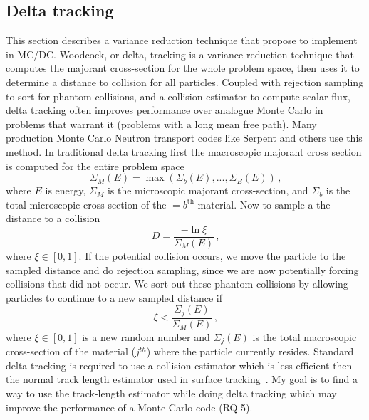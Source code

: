 %

\subsection{Delta tracking}

This section describes a variance reduction technique that propose to implement in MC/DC.
Woodcock, or delta, tracking \cite{woodcock_techniques_1965} is a variance-reduction technique that computes the majorant cross-section for the whole problem space, then uses it to determine a distance to collision for all particles.
Coupled with rejection sampling to sort for phantom collisions, and a collision estimator to compute scalar flux, delta tracking often improves performance over analogue Monte Carlo in problems that warrant it (problems with a long mean free path).
Many production Monte Carlo Neutron transport codes like Serpent \cite{leppanen_development_2013, leppanen_use_2017, leppanen_2010_burnup} and others \cite{delta2017rowland} use this method.
In traditional delta tracking first the macroscopic majorant cross section is computed for the entire problem space
\begin{equation}
    \label{eq:majorant}
    \Sigma_{M}(E) = \max\left(\Sigma_{b}(E), ..., \Sigma_{B}(E)\right) \,\text{,}
\end{equation}
where $E$ is energy, $\Sigma_{M}$ is the microscopic majorant cross-section, and $\Sigma_{b}$ is the total microscopic cross-section of the $=b^{\text{th}}$ material.
Now to sample a the distance to a collision
\begin{equation}
    \label{eq:sample}
    D = \frac{-\ln{\xi}}{\Sigma_{M}(E)} \, \text{,} 
\end{equation}
where $\xi\in[0,1]$.
If the potential collision occurs, we move the particle to the sampled distance and do rejection sampling, since we are now potentially forcing collisions that did not occur.
We sort out these phantom collisions by allowing particles to continue to a new sampled distance if
\begin{equation}
    \label{eq:reject}
    \xi < \frac{ \Sigma_{j}(E) } { \Sigma_M(E) } \, \text{,}
\end{equation}
where $\xi\in[0,1]$ is a new random number and $\Sigma_{j}(E)$ is the total macroscopic cross-section of the material ($j^{th}$) where the particle currently resides.
Standard delta tracking is required to use a collision estimator which is less efficient then the normal track length estimator used in surface tracking~\cite{mc2018}.
My goal is to find a way to use the track-length estimator while doing delta tracking which may improve the performance of a Monte Carlo code (RQ 5).
